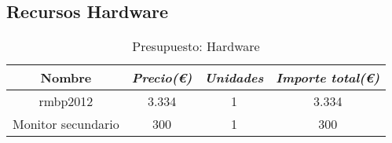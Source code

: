 \subsection{Recursos Hardware}

\begin{table}[htp]
	\centering
	\caption{Presupuesto: Hardware}\label{tab:budget-hardware}
	\begin{tabular}{cccc}
		\toprule
    	\textbf{Nombre} & \emph{Precio(\euro)} & \emph{Unidades} & \emph{Importe total(\euro)}\\
    	\midrule
    	\acrshort{rmbp}2012			& 	3.334			&	1 			&	3.334					\\
    	Monitor secundario	&	300				&	1			&	300						\\
    	\bottomrule
    \end{tabular}
\end{table}